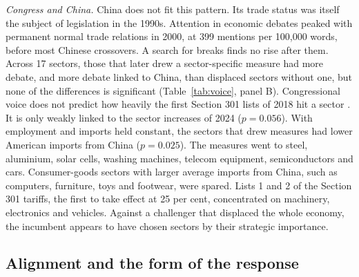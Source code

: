 \documentclass[review,authoryear,12pt]{elsarticle}
\begin{document}
\emph{Congress and China.} China does not fit this pattern. Its trade status was itself the subject of legislation in the 1990s. Attention in economic debates peaked with permanent normal trade relations in 2000, at 399 mentions per 100,000 words, before most Chinese crossovers. A search for breaks finds no rise after them. Across 17 sectors, those that later drew a sector-specific measure had more debate, and more debate linked to China, than displaced sectors without one, but none of the differences is significant (Table~\ref{tab:voice}, panel B). Congressional voice does not predict how heavily the first Section 301 lists of 2018 hit a sector \citep[Spearman $\rho=0.06$;][]{ustr301}. It is only weakly linked to the sector increases of 2024 ($p=0.056$). With employment and imports held constant, the sectors that drew measures had lower American imports from China ($p=0.025$). The measures went to steel, aluminium, solar cells, washing machines, telecom equipment, semiconductors and cars. Consumer-goods sectors with larger average imports from China, such as computers, furniture, toys and footwear, were spared. Lists 1 and 2 of the Section 301 tariffs, the first to take effect at 25 per cent, concentrated on machinery, electronics and vehicles. Against a challenger that displaced the whole economy, the incumbent appears to have chosen sectors by their strategic importance.

\subsection{Alignment and the form of the response}\label{sec:form}
\end{document}
